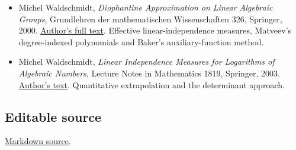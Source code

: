 \documentclass[
  11pt,
  a4paper,
]{article}
\providecommand{\tightlist}{%
  \setlength{\itemsep}{0pt}\setlength{\parskip}{0pt}}
\begin{document}
\begin{itemize}
\tightlist
\item
  Michel Waldschmidt, \emph{Diophantine Approximation on Linear
  Algebraic Groups}, Grundlehren der mathematischen Wissenschaften 326,
  Springer, 2000.
  \href{https://webusers.imj-prg.fr/~michel.waldschmidt/articles/pdf/dalag.pdf}{Author's
  full text}. Effective linear-independence measures, Matveev's
  degree-indexed polynomials and Baker's auxiliary-function method.
\item
  Michel Waldschmidt, \emph{Linear Independence Measures for Logarithms
  of Algebraic Numbers}, Lecture Notes in Mathematics 1819, Springer,
  2003.
  \href{https://webusers.imj-prg.fr/~michel.waldschmidt/articles/pdf/SpringerLN1819-2003.pdf}{Author's
  text}. Quantitative extrapolation and the determinant approach.
\end{itemize}

\subsection{Editable source}\label{editable-source}

\href{https://kokunoyumeto.github.io/open-math-courses-public/courses/TR-BAKER/src/TR-BAKER-05.md}{Markdown source}.
\end{document}
